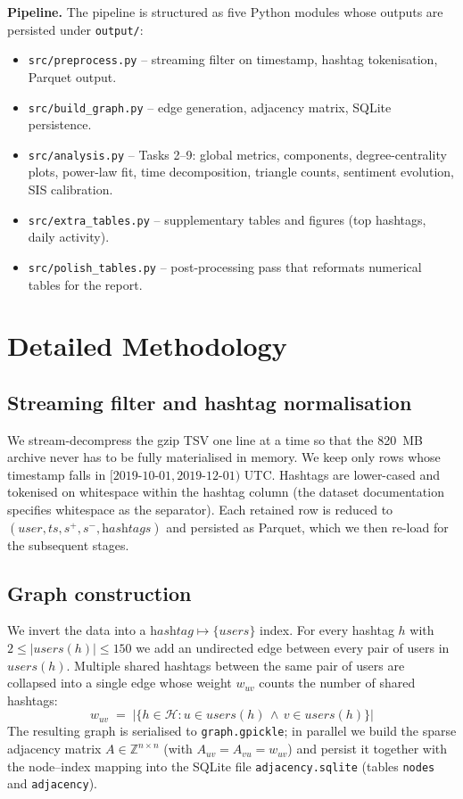 \documentclass[conference]{IEEEtran}
\begin{document}
\textbf{Pipeline.}  The pipeline is structured as five Python
modules whose outputs are persisted under \texttt{output/}:
\begin{itemize}
  \item \texttt{src/preprocess.py} -- streaming filter on
        timestamp, hashtag tokenisation, Parquet output.
  \item \texttt{src/build\_graph.py} -- edge generation,
        adjacency matrix, SQLite persistence.
  \item \texttt{src/analysis.py} -- Tasks 2--9: global metrics,
        components, degree-centrality plots, power-law fit,
        time decomposition, triangle counts, sentiment
        evolution, SIS calibration.
  \item \texttt{src/extra\_tables.py} -- supplementary tables
        and figures (top hashtags, daily activity).
  \item \texttt{src/polish\_tables.py} -- post-processing pass
        that reformats numerical tables for the report.
\end{itemize}

\section{Detailed Methodology}
\label{sec:method-detail}

\subsection{Streaming filter and hashtag normalisation}
\label{sec:filter}
We stream-decompress the gzip TSV one line at a time so that
the 820~MB archive never has to be fully materialised in
memory.  We keep only rows whose timestamp falls in
$[\text{2019-10-01}, \text{2019-12-01})$ UTC.  Hashtags are
lower-cased and tokenised on whitespace within the hashtag
column (the dataset documentation specifies whitespace as the
separator).  Each retained row is reduced to
$(\textit{user}, \textit{ts}, s^{+}, s^{-},
\textit{hashtags})$ and persisted as Parquet, which we then
re-load for the subsequent stages.

\subsection{Graph construction}
\label{sec:graph-build}
We invert the data into a $\textit{hashtag} \mapsto \{users\}$
index.  For every hashtag $h$ with
$2 \le |\textit{users}(h)| \le 150$ we add an undirected edge
between every pair of users in $\textit{users}(h)$.  Multiple
shared hashtags between the same pair of users are collapsed
into a single edge whose weight $w_{uv}$ counts the number of
shared hashtags:
\begin{equation}
  w_{uv} \;=\; \big|\{ h \in \mathcal{H} :
    u \in \textit{users}(h) \,\wedge\,
    v \in \textit{users}(h) \}\big|
  \label{eq:weight}
\end{equation}
The resulting graph is serialised to \texttt{graph.gpickle};
in parallel we build the sparse adjacency matrix
$A \in \mathbb{Z}^{n \times n}$ (with $A_{uv}=A_{vu}=w_{uv}$)
and persist it together with the node--index mapping into the
SQLite file \texttt{adjacency.sqlite} (tables \texttt{nodes}
and \texttt{adjacency}).
\end{document}
